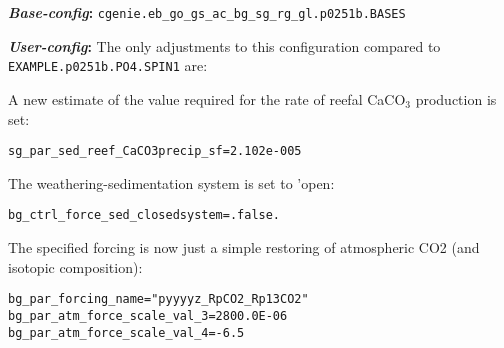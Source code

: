 \documentclass[10pt,twoside]{article}
\begin{document}
\noindent \textbf{\textit{Base-config}:} \texttt{cgenie.eb\_go\_gs\_ac\_bg\_sg\_rg\_gl.p0251b.BASES}

\noindent \textbf{\textit{User-config}:} The only adjustments to this configuration compared to \texttt{EXAMPLE.p0251b.PO4.SPIN1} are:

\begin{compactitem}

        \item A new estimate of the value required for the rate of reefal CaCO$_{3}$ production is set:
\vspace{-5pt}\begin{verbatim}
sg_par_sed_reef_CaCO3precip_sf=2.102e-005
                \end{verbatim}\vspace{-5pt}
        \item The weathering-sedimentation system is set to 'open:
\vspace{-5pt}\begin{verbatim}
bg_ctrl_force_sed_closedsystem=.false.
                \end{verbatim}\vspace{-5pt}
        \item The specified forcing is now just a simple restoring of atmospheric CO2 (and isotopic composition):
\vspace{-5pt}\begin{verbatim}
bg_par_forcing_name="pyyyyz_RpCO2_Rp13CO2"
bg_par_atm_force_scale_val_3=2800.0E-06
bg_par_atm_force_scale_val_4=-6.5
                \end{verbatim}\vspace{-5pt}
        
\end{compactitem}
                
\end{document}
